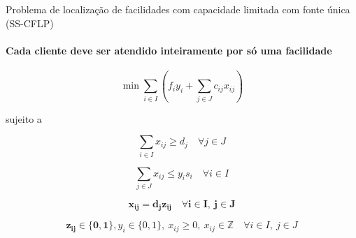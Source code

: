 \documentclass[aspectratio=169]{beamer}
\begin{document}
	\begin{frame}{Problema de localização de facilidades com capacidade limitada com fonte única (SS-CFLP)}
		\framesubtitle{Cada cliente deve ser atendido inteiramente por só uma facilidade}

		\begin{equation}
			\label{ss:obj}		
			\min \sum_{i \in I} 
			(
			f_i y_i + \sum_{j \in J} c_{ij} x_{ij}
			)
		\end{equation}
		
		sujeito a 				
		
		\begin{equation}
			\label{ss:const:demand}		
			\sum_{i \in I} x_{ij} \ge d_j 
			\quad
			\forall j \in J
		\end{equation}
	
		\begin{equation}
			\label{ss:const:capacity}		
			\sum_{j \in J} x_{ij} \le y_i s_i 
			\quad
			\forall i \in I
		\end{equation}
	
		\begin{equation}
			\label{ss:const:int}		
			\boldsymbol{x_{ij} = d_j z_{ij}}  
			\quad
			\boldsymbol{\forall i \in I, \ j \in J}
		\end{equation}

		\begin{equation}
			\label{ss:dom:var}		
			\boldsymbol{z_{ij} \in \{0,1\}},
			y_i \in \{0, 1\}, 
			\ x_{ij} \ge 0, 
			\ x_{ij} \in \mathbb{Z}
			\quad
			\forall i \in I, \ j \in J
		\end{equation}
		
		
		
		
		
	\end{frame}
\end{document}
